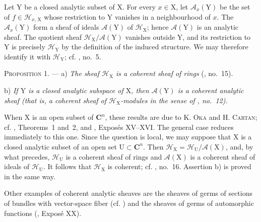 Let $\mathrm{Y}$ be a closed analytic subset of $\mathrm{X}$. For every $x\in\mathrm{X}$, let $\mathcal{A}_x(\mathrm{Y})$ be the set of $f\in\mathcal{H}_{x,\,\mathrm{X}}$ whose restriction to $\mathrm{Y}$ vanishes in a neighbourhood of $x$. The $\mathcal{A}_x(\mathrm{Y})$ form a sheaf of ideals $\mathcal{A}(\mathrm{Y})$ of $\mathcal{H}_{\mathrm{X}}$; hence $\mathcal{A}(\mathrm{Y})$ is an analytic sheaf. The quotient sheaf $\mathcal{H}_{\mathrm{X}}/\mathcal{A}(\mathrm{Y})$ vanishes outside $\mathrm{Y}$, and its restriction to $\mathrm{Y}$ is precisely $\mathcal{H}_{\mathrm{Y}}$ by the definition of the induced structure. We may therefore identify it with $\mathcal{H}_{\mathrm{Y}}$; cf. , no.~5.

\textsc{Proposition 1}. --- a) \emph{The sheaf $\mathcal{H}_{\mathrm{X}}$ is a coherent sheaf of rings} (, no.~15).

b) \emph{If $\mathrm{Y}$ is a closed analytic subspace of $\mathrm{X}$, then $\mathcal{A}(\mathrm{Y})$ is a coherent analytic sheaf (that is, a coherent sheaf of $\mathcal{H}_{\mathrm{X}}$-modules in the sense of , no.~12).}

When $\mathrm{X}$ is an open subset of $\mathbf{C}^n$, these results are due to K. \textsc{Oka} and H. \textsc{Cartan}; cf. , Theorems~1 and~2, and , Expos\'es XV--XVI. The general case reduces immediately to this one. Since the question is local, we may suppose that $\mathrm{X}$ is a closed analytic subset of an open set $\mathrm{U}\subset\mathbf{C}^n$. Then $\mathcal{H}_{\mathrm{X}}=\mathcal{H}_{\mathrm{U}}/\mathcal{A}(\mathrm{X})$, and, by what precedes, $\mathcal{H}_{\mathrm{U}}$ is a coherent sheaf of rings and $\mathcal{A}(\mathrm{X})$ is a coherent sheaf of ideals of $\mathcal{H}_{\mathrm{U}}$. It follows that $\mathcal{H}_{\mathrm{X}}$ is coherent; cf. , no.~16. Assertion b) is proved in the same way.

Other examples of coherent analytic sheaves are the sheaves of germs of sections of bundles with vector-space fiber (cf. ) and the sheaves of germs of automorphic functions (, Expos\'e XX).


